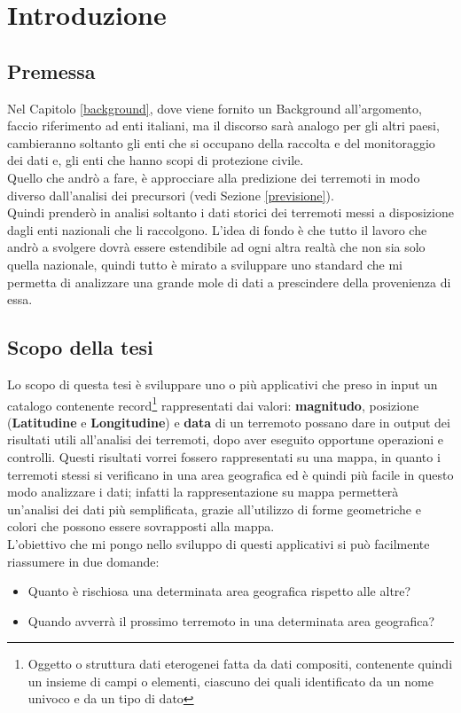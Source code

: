 \chapter*{Introduzione}

\section*{Premessa}
Nel Capitolo \ref{background}, dove viene fornito un Background all'argomento, faccio riferimento ad enti italiani, ma il discorso sar\`a analogo per gli altri paesi, cambieranno soltanto gli enti che si occupano della raccolta e del monitoraggio dei dati e, gli enti che hanno scopi di protezione civile.\\
Quello che andr\`o a fare, \`e approcciare alla predizione dei terremoti in modo diverso dall'analisi dei precursori (vedi Sezione \ref{previsione}).\\
Quindi prender\`o in analisi soltanto i dati storici dei terremoti messi a disposizione dagli enti nazionali che li raccolgono. L'idea di fondo \`e che tutto il lavoro che andr\`o a svolgere dovr\`a essere estendibile ad ogni altra realt\`a che non sia solo quella nazionale, quindi tutto \`e mirato a sviluppare uno standard che mi permetta di analizzare una grande mole di dati a prescindere della provenienza di essa.


\section*{Scopo della tesi}
Lo scopo di questa tesi \`e sviluppare uno o pi\`u applicativi che preso in input un catalogo contenente record\footnote{Oggetto o struttura dati eterogenei fatta da dati compositi, contenente quindi un insieme di campi o elementi, ciascuno dei quali identificato da un nome univoco e da un tipo di dato} rappresentati dai valori: \textbf{magnitudo}, posizione (\textbf{Latitudine} e \textbf{Longitudine}) e \textbf{data} di un terremoto possano dare in output dei risultati utili all'analisi dei terremoti, dopo aver eseguito opportune operazioni e controlli. Questi risultati vorrei fossero rappresentati su una mappa, in quanto i terremoti stessi si verificano in una area geografica ed \`e quindi pi\`u facile in questo modo analizzare i dati; infatti la rappresentazione su mappa permetter\`a un'analisi dei dati pi\`u semplificata, grazie all'utilizzo di forme geometriche e colori che possono essere sovrapposti alla mappa.\\
L'obiettivo che mi pongo nello sviluppo di questi applicativi si pu\`o facilmente riassumere in due domande:
\begin{itemize}
    \item Quanto \`e rischiosa una determinata area geografica rispetto alle altre?
    \item Quando avverr\`a il prossimo terremoto in una determinata area geografica?
\end{itemize}